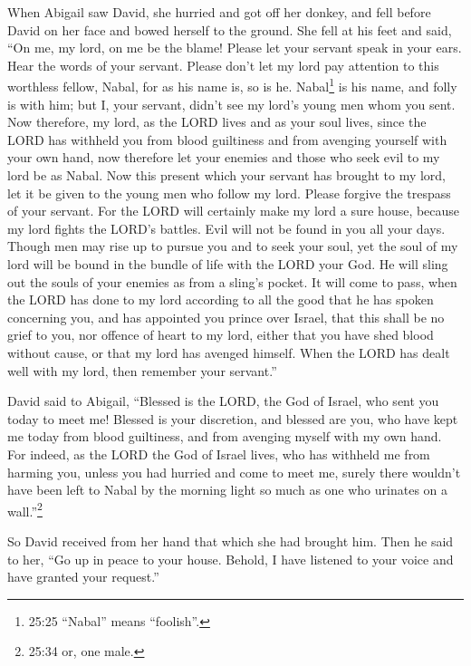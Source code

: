  When Abigail saw David, she hurried and got off her
donkey, and fell before David on her face and bowed herself to the
ground.  She fell at his feet and said, ``On me, my lord,
on me be the blame! Please let your servant speak in your ears. Hear the
words of your servant.  Please don't let my lord pay
attention to this worthless fellow, Nabal, for as his name is, so is he.
Nabal\footnote{25:25 ``Nabal'' means ``foolish''.} is his name, and
folly is with him; but I, your servant, didn't see my lord's young men
whom you sent.  Now therefore, my lord, as the LORD lives
and as your soul lives, since the LORD has withheld you from blood
guiltiness and from avenging yourself with your own hand, now therefore
let your enemies and those who seek evil to my lord be as Nabal.
 Now this present which your servant has brought to my
lord, let it be given to the young men who follow my lord. 
Please forgive the trespass of your servant. For the LORD will certainly
make my lord a sure house, because my lord fights the LORD's battles.
Evil will not be found in you all your days.  Though men
may rise up to pursue you and to seek your soul, yet the soul of my lord
will be bound in the bundle of life with the LORD your God. He will
sling out the souls of your enemies as from a sling's pocket.
 It will come to pass, when the LORD has done to my lord
according to all the good that he has spoken concerning you, and has
appointed you prince over Israel,  that this shall be no
grief to you, nor offence of heart to my lord, either that you have shed
blood without cause, or that my lord has avenged himself. When the LORD
has dealt well with my lord, then remember your servant.''

 David said to Abigail, ``Blessed is the LORD, the God of
Israel, who sent you today to meet me!  Blessed is your
discretion, and blessed are you, who have kept me today from blood
guiltiness, and from avenging myself with my own hand.  For
indeed, as the LORD the God of Israel lives, who has withheld me from
harming you, unless you had hurried and come to meet me, surely there
wouldn't have been left to Nabal by the morning light so much as one who
urinates on a wall.''\footnote{25:34 or, one male.}

 So David received from her hand that which she had brought
him. Then he said to her, ``Go up in peace to your house. Behold, I have
listened to your voice and have granted your request.''

